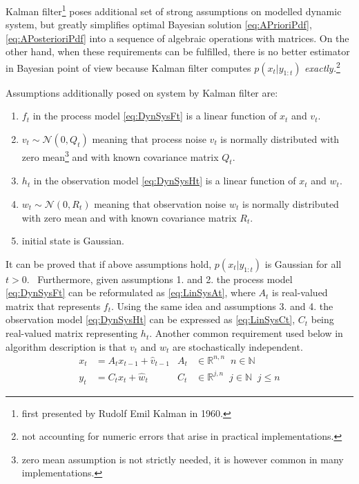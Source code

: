 Kalman filter\footnote{first presented by Rudolf Emil Kalman in 1960.} poses additional set of strong
assumptions on modelled dynamic system, but greatly
simplifies optimal Bayesian solution \eqref{eq:APrioriPdf}, \eqref{eq:APosterioriPdf} into a
sequence of algebraic operations with matrices. On the other hand, when these requirements can be
fulfilled, there is no better estimator in Bayesian point of view because Kalman filter computes
\(p(x_t | y_{1:t})\) \emph{exactly.}\footnote{not accounting for numeric errors that arise in
practical implementations.}

Assumptions additionally posed on system by Kalman filter are:
\begin{enumerate}
	\item \(f_t\) in the process model \eqref{eq:DynSysFt} is a linear function of \(x_t\) and
	\(v_t\).
	\item \(v_t \sim \mathcal{N}(0, Q_t)\) meaning that process noise \(v_t\) is normally
	distributed with zero mean\footnote{zero mean assumption is not strictly needed, it is however
	common in many implementations.} and with known covariance matrix \(Q_t\).
	\item \(h_t\) in the observation model \eqref{eq:DynSysHt} is a linear function of \(x_t\) and
	\(w_t\).
	\item \(w_t \sim \mathcal{N}(0, R_t)\) meaning that observation noise \(w_t\) is normally distributed
	with zero mean and with known covariance matrix \(R_t\).
	\item initial state {\pdf} is Gaussian.
\end{enumerate}

It can be proved that if above assumptions hold, \(p(x_t|y_{1:t})\) is Gaussian for all
\(t > 0\).~\cite{Pet:81} Furthermore, given assumptions 1. and 2. the process model
\eqref{eq:DynSysFt} can be reformulated as \eqref{eq:LinSysAt}, where \(A_t\) is real-valued matrix
that represents \(f_t\).
Using the same idea and assumptions 3. and 4. the observation model \eqref{eq:DynSysHt} can be
expressed as \eqref{eq:LinSysCt}, \(C_t\) being real-valued matrix representing \(h_t\). Another
common requirement used below in algorithm description is that \(v_t\) and \(w_t\) are
stochastically independent.
\begin{align}
	x_t &= A_t x_{t-1} + \hat{v}_{t-1} & A_t &\in \mathbb{R}^{n,n} \;\; n \in \mathbb{N} \label{eq:LinSysAt} \\
	y_t &= C_t x_t + \hat{w}_t & C_t &\in \mathbb{R}^{j,n} \;\; j \in \mathbb{N} \;\; j \leq n \label{eq:LinSysCt}
\end{align}

